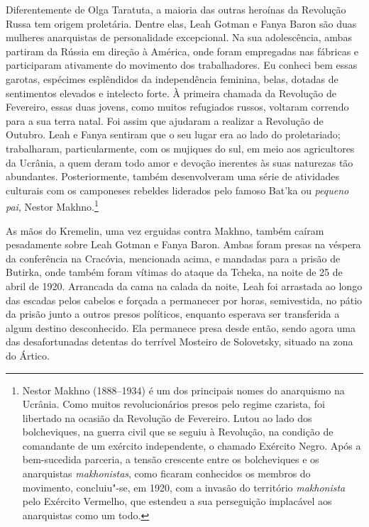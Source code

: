 Diferentemente de Olga Taratuta, a maioria das outras heroínas da
Revolução Russa tem origem proletária. Dentre elas, Leah Gotman e Fanya
Baron são duas mulheres anarquistas de personalidade excepcional. Na sua
adolescência, ambas partiram da Rússia em direção à América, onde foram
empregadas nas fábricas e participaram ativamente do movimento dos
trabalhadores. Eu conheci bem essas garotas, espécimes esplêndidos da
independência feminina, belas, dotadas de sentimentos elevados e
intelecto forte. À primeira chamada da Revolução de Fevereiro, essas
duas jovens, como muitos refugiados russos, voltaram correndo para a sua terra
natal. Foi assim que ajudaram a realizar a Revolução de Outubro. Leah e
Fanya sentiram que o seu lugar era ao lado do proletariado; trabalharam,
particularmente, com os mujiques do sul, em meio aos agricultores da
Ucrânia, a quem deram todo amor e devoção inerentes às suas naturezas
tão abundantes. Posteriormente, também desenvolveram uma série de
atividades culturais com os camponeses rebeldes liderados pelo famoso
Bat'ka ou \textit{pequeno pai}, Nestor Makhno.\footnote{Nestor Makhno
  (1888--1934) é um dos principais nomes do anarquismo na Ucrânia. Como
  muitos revolucionários presos pelo regime czarista, foi libertado na
  ocasião da Revolução de Fevereiro. Lutou ao lado dos bolcheviques, na guerra civil que se seguiu à Revolução, na condição de comandante de um exército independente, o chamado Exército Negro. Após a bem-sucedida parceria, a tensão crescente entre os bolcheviques e os anarquistas \textit{makhonistas}, como
  ficaram conhecidos os membros do movimento,
  concluiu"-se, em 1920, com a invasão do território \textit{makhonista} pelo
  Exército Vermelho, que estendeu a sua perseguição implacável aos
  anarquistas como um todo.}

As mãos do Kremelin, uma vez erguidas contra Makhno, também caíram
pesadamente sobre Leah Gotman e Fanya Baron. Ambas foram presas na
véspera da conferência na Cracóvia, mencionada acima, e mandadas para a
prisão de Butirka, onde também foram vítimas do ataque da Tcheka, na
noite de 25 de abril de 1920. Arrancada da cama na calada da noite, Leah
foi arrastada ao longo das escadas pelos cabelos e forçada a permanecer por
horas, semivestida, no pátio da prisão junto a outros presos políticos,
enquanto esperava ser transferida a algum destino desconhecido. Ela
permanece presa desde então, sendo agora uma das desafortunadas detentas
do terrível Mosteiro de Solovetsky, situado na zona do Ártico.

